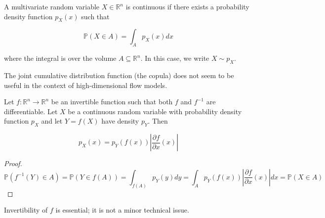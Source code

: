 \documentclass{report}
\begin{document}
\begin{concept}
    A multivariate random variable $X \in \mathbb{R}^{n}$ is continuous if there exists a probability density function $p_{X}(x)$ such that

    $$
    \mathbb{P}(X \in A)=\int_{A} p_{X}(x) d x
    $$

    where the integral is over the volume $A \subseteq \mathbb{R}^{n}$. In this case, we write $X \sim p_{X}$.

    The joint cumulative distribution function (the copula) does not seem to be useful in the context of high-dimensional flow models.
\end{concept}

\begin{concept}
    Let $f: \mathbb{R}^{n} \rightarrow \mathbb{R}^{n}$ be an invertible function such that both $f$ and $f^{-1}$ are differentiable. Let $X$ be a continuous random variable with probability density function $p_{X}$ and let $Y=f(X)$ have density $p_{Y}$. Then

    $$
    p_{X}(x)=p_{Y}(f(x))\left|\frac{\partial f}{\partial x}(x)\right|
    $$

    \begin{proof}
        $$
        \mathbb{P}\left(f^{-1}(Y) \in A\right)=\mathbb{P}(Y \in f(A))=\int_{f(A)} p_{Y}(y) d y=\int_{A} p_{Y}(f(x))\left|\frac{\partial f}{\partial x}(x)\right| d x=\mathbb{P}(X \in A)
        $$
    \end{proof}

    Invertibility of $f$ is essential; it is not a minor technical issue.
\end{concept}
\end{document}
